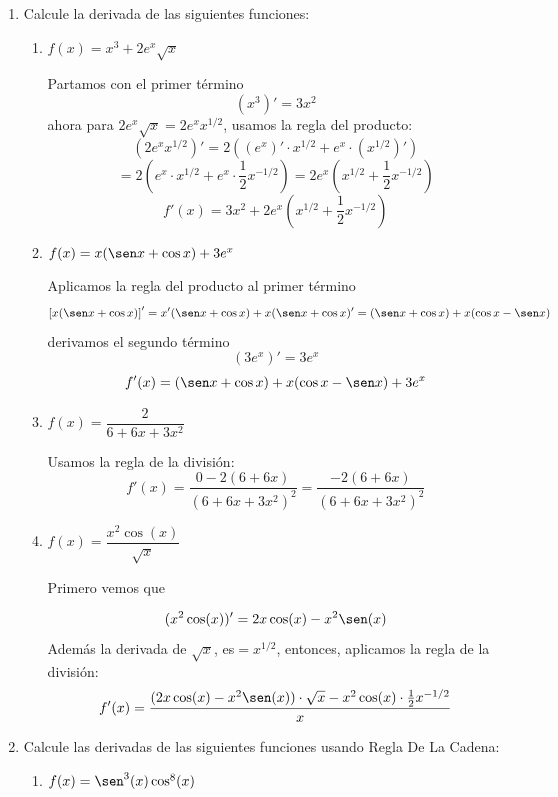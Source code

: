 \documentclass[letterpaper,12pt]{article}
\theoremstyle{plain}
\theoremstyle{definition}
\newcommand{\1}{\mathbbm{1}}
\begin{document}
\begin{enumerate}[label=\textbf{P\arabic*.}, itemsep=0cm]
\item Calcule la derivada de las siguientes funciones:
\begin{enumerate}
    \item \( f(x) = x^3 + 2e^x \sqrt{x} \)

 \color{blue}
     Partamos con el primer término
    \[
    (x^3)' = 3x^2
    \]
    ahora para \( 2e^x \sqrt{x} = 2e^x x^{1/2} \), usamos la regla del producto:
    \[
    (2e^x x^{1/2})' = 2\left( (e^x)' \cdot x^{1/2} + e^x \cdot (x^{1/2})' \right)
    \]
    \[
    = 2\left( e^x \cdot x^{1/2} + e^x \cdot \frac{1}{2}x^{-1/2} \right)
    = 2e^x\left( x^{1/2} + \frac{1}{2}x^{-1/2} \right)
  \]
  \[ f'(x) = 3x^2 + 2e^x\left( x^{1/2} + \frac{1}{2}x^{-1/2} \right)
    \]

    
\color{black}

    \item \( f(x) = x(\sen x + \cos x) + 3e^x \)

 \color{blue}
     Aplicamos la regla del producto al primer término
\[
\left[ x(\sen x + \cos x) \right]' =x'(\sen x + \cos x) + x(\sen x + \cos x)' = (\sen x + \cos x) + x(\cos x - \sen x) 
\]
derivamos el segundo término
\[
(3e^x)' = 3e^x
\]
\[
f'(x) = (\sen x + \cos x) + x(\cos x - \sen x) + 3e^x
\]
\color{black}

    \item \( f(x) = \dfrac{2}{6 + 6x + 3x^2} \)

 \color{blue}
     Usamos la regla de la división:
\[
f'(x)= \frac{0 - 2(6 + 6x)}{(6 + 6x + 3x^2)^2} = \frac{-2(6 + 6x)}{(6 + 6x + 3x^2)^2}
\]
\color{black}

    \item \( f(x) = \dfrac{x^2 \cos(x)}{\sqrt{x}} \)

 \color{blue}
     Primero vemos que
    
\[
(x^2 \cos(x))' = 2x \cos(x) - x^2 \sen(x)
\]
Además la derivada de $\sqrt{x}$, es\( = x^{1/2}\), entonces, aplicamos la regla de la división:
\[
f'(x) = \frac{(2x \cos(x) - x^2 \sen(x)) \cdot \sqrt{x} - x^2 \cos(x) \cdot \frac{1}{2}x^{-1/2}}{x}
\]
\color{black}

\end{enumerate}
\item Calcule las derivadas de las siguientes funciones usando Regla De La Cadena:
\begin{enumerate}
    \item\( f(x) = \sen^3(x) \cos^8(x) \)


\end{enumerate}
\end{enumerate}
\end{document}
